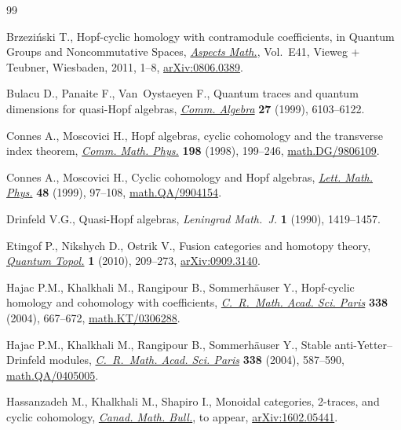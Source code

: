 \documentclass[pdftex]{sigma}
\numberwithin{equation}{section}
\begin{document}
\begin{thebibliography}{99}
\footnotesize\itemsep=0pt

Brzezi\'nski T., Hopf-cyclic homology with contramodule coefficients, in
 Quantum Groups and Noncommutative Spaces, \href{https://doi.org/10.1007/978-3-8348-9831-9_1}{\textit{Aspects Math.}}, Vol.~E41,
 Vieweg + Teubner, Wiesbaden, 2011, 1--8, \href{https://arxiv.org/abs/0806.0389}{arXiv:0806.0389}.

Bulacu D., Panaite F., Van~Oystaeyen F., Quantum traces and quantum dimensions
 for quasi-{H}opf algebras, \href{https://doi.org/10.1080/00927879908826809}{\textit{Comm. Algebra}} \textbf{27} (1999),
 6103--6122.

Connes A., Moscovici H., Hopf algebras, cyclic cohomology and the transverse
 index theorem, \href{https://doi.org/10.1007/s002200050477}{\textit{Comm. Math. Phys.}} \textbf{198} (1998), 199--246,
 \href{https://arxiv.org/abs/math.DG/9806109}{math.DG/9806109}.

Connes A., Moscovici H., Cyclic cohomology and {H}opf algebras, \href{https://doi.org/10.1023/A:1007527510226}{\textit{Lett.
 Math. Phys.}} \textbf{48} (1999), 97--108, \href{https://arxiv.org/abs/math.QA/9904154}{math.QA/9904154}.

Drinfeld V.G., Quasi-{H}opf algebras, \textit{Leningrad Math.~J.} \textbf{1}
 (1990), 1419--1457.

Etingof P., Nikshych D., Ostrik V., Fusion categories and homotopy theory,
 \href{https://doi.org/10.4171/QT/6}{\textit{Quantum Topol.}} \textbf{1} (2010), 209--273, \href{https://arxiv.org/abs/0909.3140}{arXiv:0909.3140}.

Hajac P.M., Khalkhali M., Rangipour B., Sommerh\"auser Y., Hopf-cyclic homology
 and cohomology with coefficients, \href{https://doi.org/10.1016/j.crma.2003.11.036}{\textit{C.~R.~Math. Acad. Sci. Paris}}
 \textbf{338} (2004), 667--672, \href{https://arxiv.org/abs/math.KT/0306288}{math.KT/0306288}.

Hajac P.M., Khalkhali M., Rangipour B., Sommerh\"auser Y., Stable
 anti-{Y}etter--{D}rinfeld modules, \href{https://doi.org/10.1016/j.crma.2003.11.037}{\textit{C.~R.~Math. Acad. Sci. Paris}}
 \textbf{338} (2004), 587--590, \href{https://arxiv.org/abs/math.QA/0405005}{math.QA/0405005}.

Hassanzadeh M., Khalkhali M., Shapiro I., Monoidal categories, 2-traces, and
 cyclic cohomology, \href{http://dx.doi.org/10.4153/CMB-2018-016-4}{\textit{Canad. Math. Bull.}}, {t}o appear,
 \href{https://arxiv.org/abs/1602.05441}{arXiv:1602.05441}.


\end{thebibliography}
\end{document}
